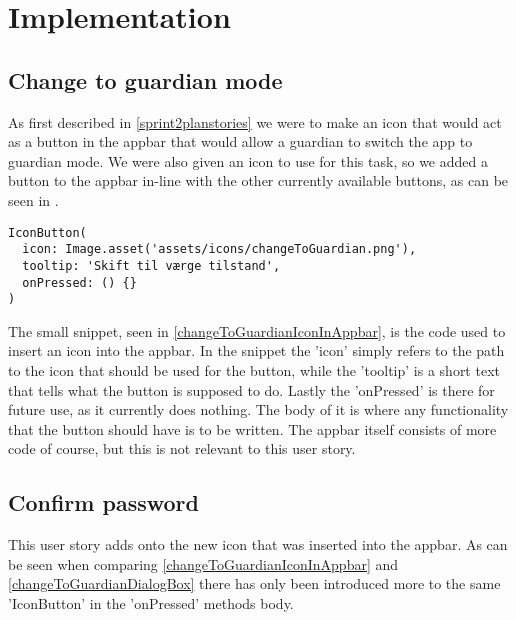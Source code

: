 \section{Implementation}

\subsection{Change to guardian mode} \label{changeToGuardianIconImpl}
As first described in \autoref{sprint2planstories} we were to make an icon that would act as a button in the appbar that would allow a guardian to switch the app to guardian mode.
We were also given an icon to use for this task, so we added a button to the appbar in-line with the other currently available buttons, as can be seen in .


\begin{lstlisting}[caption={The code used to insert the change to guardian icon in the appbar}, captionpos=b, label=changeToGuardianIconInAppbar]
IconButton(
  icon: Image.asset('assets/icons/changeToGuardian.png'),
  tooltip: 'Skift til værge tilstand',
  onPressed: () {}
)
\end{lstlisting}

The small snippet, seen in \autoref{changeToGuardianIconInAppbar}, is the code used to insert an icon into the appbar.
In the snippet the 'icon' simply refers to the path to the icon that should be used for the button, while the 'tooltip' is a short text that tells what the button is supposed to do.
Lastly the 'onPressed' is there for future use, as it currently does nothing.
The body of it is where any functionality that the button should have is to be written.
The appbar itself consists of more code of course, but this is not relevant to this user story.

\subsection{Confirm password} \label{changeToGuardianDialogBoxImpl}
This user story adds onto the new icon that was inserted into the appbar.
As can be seen when comparing \autoref{changeToGuardianIconInAppbar} and \autoref{changeToGuardianDialogBox} there has only been introduced more to the same 'IconButton' in the 'onPressed' methods body.


